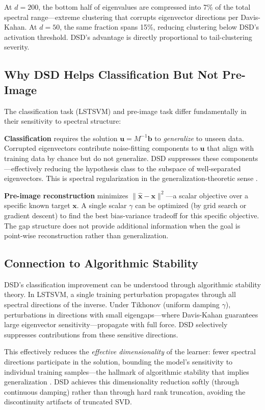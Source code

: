 \documentclass[preprint,review,12pt]{elsarticle}
\begin{document}
At $d{=}200$, the bottom half of eigenvalues are compressed into 7\% of the total spectral range---extreme clustering that corrupts eigenvector directions per Davis-Kahan. At $d{=}50$, the same fraction spans 15\%, reducing clustering below DSD's activation threshold. DSD's advantage is directly proportional to tail-clustering severity.

\subsection{Why DSD Helps Classification But Not Pre-Image}

The classification task (LSTSVM) and pre-image task differ fundamentally in their sensitivity to spectral structure:

\textbf{Classification} requires the solution $\bm{u} = M^{-1} \bm{b}$ to \emph{generalize} to unseen data. Corrupted eigenvectors contribute noise-fitting components to $\bm{u}$ that align with training data by chance but do not generalize. DSD suppresses these components---effectively reducing the hypothesis class to the subspace of well-separated eigenvectors. This is spectral regularization in the generalization-theoretic sense \cite{bousquet2002stability}.

\textbf{Pre-image reconstruction} minimizes $\|\hat{\bm{x}} - \bm{x}\|^2$---a scalar objective over a specific known target $\bm{x}$. A single scalar $\gamma$ can be optimized (by grid search or gradient descent) to find the best bias-variance tradeoff for this specific objective. The gap structure does not provide additional information when the goal is point-wise reconstruction rather than generalization.

\subsection{Connection to Algorithmic Stability}

DSD's classification improvement can be understood through algorithmic stability theory. In LSTSVM, a single training perturbation propagates through all spectral directions of the inverse. Under Tikhonov (uniform damping $\gamma$), perturbations in directions with small eigengaps---where Davis-Kahan guarantees large eigenvector sensitivity---propagate with full force. DSD selectively suppresses contributions from these sensitive directions.

This effectively reduces the \emph{effective dimensionality} of the learner: fewer spectral directions participate in the solution, bounding the model's sensitivity to individual training samples---the hallmark of algorithmic stability that implies generalization \cite{bousquet2002stability}. DSD achieves this dimensionality reduction softly (through continuous damping) rather than through hard rank truncation, avoiding the discontinuity artifacts of truncated SVD.
\end{document}
